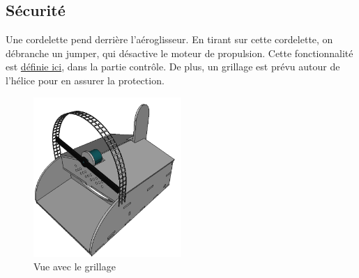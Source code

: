 \documentclass[a4paper,12pt]{book}
\begin{document}
			\subsection{Sécurité} Une cordelette pend derrière l'aéroglisseur. En tirant sur cette cordelette, on débranche un jumper, qui désactive le moteur de propulsion. Cette fonctionnalité est \hyperref[secu]{définie ici}, dans la partie contrôle. De plus, un grillage est prévu autour de l'hélice pour en assurer la protection.
			\begin{figure}[h]
					\begin{center}
						\includegraphics[width=0.5\textwidth]{../Illus/AeroProt.png}
					\end{center}
					\caption{Vue avec le grillage}
				\end{figure}
\end{document}
